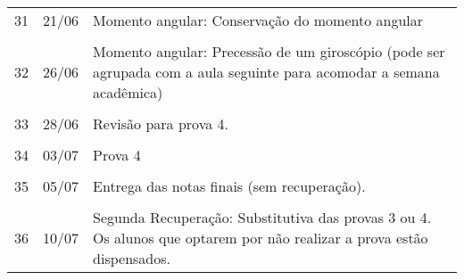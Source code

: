 \begin{center}
\begin{longtable}{ccp{70mm}}
\\
31 & 21/06 & Momento angular:  Conservação do momento angular \\
\\
32 & 26/06 & Momento angular: Precessão de um giroscópio (pode ser agrupada com a aula seguinte para acomodar a semana acadêmica) \\
\\
33 & 28/06 & Revisão para prova 4. \\
\\
34 & 03/07 & Prova 4 \\
\\
35 & 05/07 & Entrega das notas finais (sem recuperação). \\
\\
36 & 10/07 & Segunda Recuperação: Substitutiva das provas 3 ou 4. Os alunos que optarem por não realizar a prova estão dispensados. \\
\end{longtable}
\end{center}
\cleardoublepage
